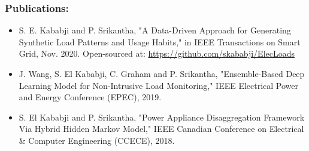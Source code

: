\documentclass[11pt]{report}
\begin{document}
\subsubsection*{Publications:}
\begin{itemize}[label={--}]

\item S. E. Kababji and P. Srikantha, "A Data-Driven Approach for Generating Synthetic Load Patterns and Usage Habits," in IEEE Transactions on Smart Grid, Nov. 2020. Open-sourced at: \url{https://github.com/skababji/ElecLoads}
\item J. Wang, S. El Kababji, C. Graham and P. Srikantha, "Ensemble-Based Deep Learning Model for Non-Intrusive Load Monitoring," IEEE Electrical Power and Energy Conference (EPEC), 2019.
\item S. El Kababji and P. Srikantha, "Power Appliance Disaggregation Framework Via Hybrid Hidden Markov Model," IEEE Canadian Conference on Electrical \& Computer Engineering (CCECE), 2018.


\end{itemize}


\singlespacing
\end{document}
